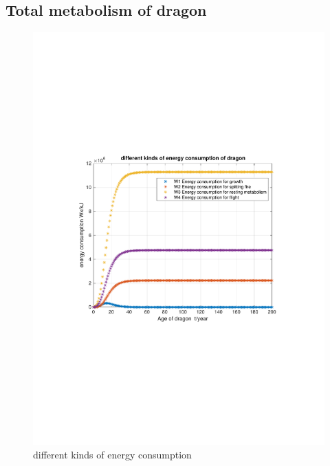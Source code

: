 \documentclass[12pt]{article}  %
\begin{document}
\subsection{Total metabolism of dragon}
\begin{figure}[h]
	\centering
	\begin{minipage}[t]{0.45\textwidth}
		\centering
		\includegraphics[width=1\textwidth]{easymcm/img/different kinds of energy consumption of dragon.pdf}
		\caption{different kinds of energy consumption }
	\end{minipage}
	\begin{minipage}[t]{0.45\textwidth}
		\centering

\end{minipage}
\end{figure}
\end{document}
